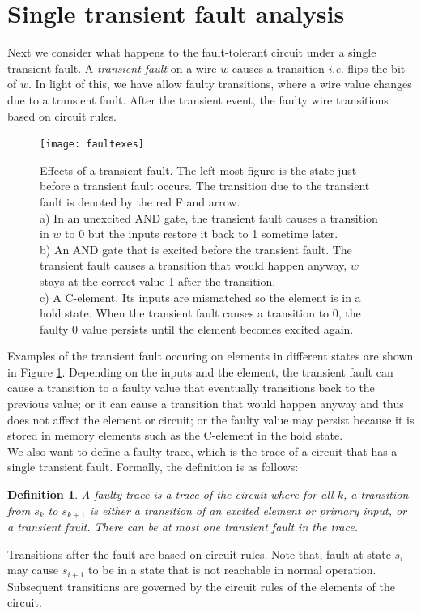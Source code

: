 \documentclass[12pt]{report}
\newtheorem*{definition}{Definition}
\begin{document}
\section{Single transient fault analysis}
Next we consider what happens to the fault-tolerant circuit under a single transient fault.  A {\em transient fault} on a wire $w$ causes a transition {\em i.e.} flips the bit of $w$.  In light of this, we have allow faulty transitions, where a wire value changes due to a transient fault.  After the transient event, the faulty wire transitions based on circuit rules.  %
\begin{figure}
  \centering
    \texttt{[image: faultexes]}
  \caption[Effects of a transient fault]{Effects of a transient fault.  The left-most figure is the state just before a transient fault occurs.  The transition due to the transient fault is denoted by the red F and arrow.   \\
  a) In an unexcited AND gate, the transient fault causes a transition in $w$ to 0 but the inputs restore it back to 1 sometime later.   \\
  b) An AND gate that is excited before the transient fault.  The transient fault causes a transition that would happen anyway, $w$ stays at the correct value 1 after the transition.\\
  c) A C-element.  Its inputs are mismatched so the element is in a hold state.  When the transient fault causes a transition to 0, the faulty 0 value persists until the element becomes excited again.
  }
  \label{fig:faultx}
\end{figure}
Examples of the transient fault occuring on elements in different states are shown in Figure \ref{fig:faultx}.  Depending on the inputs and the element, the transient fault can cause a transition to a faulty value that eventually transitions back to the previous value; or it can cause a transition that would happen anyway and thus does not affect the element or circuit; or the faulty value may persist because it is stored in memory elements such as the C-element in the hold state.\\

We also want to define a faulty trace, which is the trace of a circuit that has a single transient fault.  Formally, the definition is as follows:
\begin{definition}
A {\em faulty trace} is a trace of the circuit where for all $k$, a transition from $s_k$ to $s_{k+1}$ is either a transition of an excited element or primary input, or a transient fault.  There can be at most one transient fault in the trace.
\end{definition}
Transitions after the fault are based on circuit rules.  Note that, fault at state $s_i$ may cause $s_{i+1}$ to be in a state that is not reachable in normal operation.  Subsequent transitions are governed by the circuit rules of the elements of the circuit.\\ %
\end{document}

